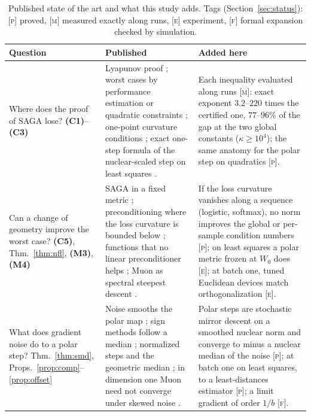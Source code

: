 \documentclass[10pt]{article}
\theoremstyle{remark}
\newcommand{\finding}[1]{\textbf{(#1)}}
\newcommand{\nat}[1]{\textsc{[#1]}}
\begin{document}
\begin{table}[t]
\caption{Published state of the art and what this study adds. Tags (Section~\ref{sec:status}): \nat{p} proved, \nat{m}
measured exactly along runs, \nat{e} experiment, \nat{f} formal expansion checked by simulation.}\label{tab:sota}
\centering\footnotesize
\renewcommand{\arraystretch}{1.05}
\begin{tabularx}{\textwidth}{@{}>{\raggedright\arraybackslash}p{}YY@{}}
\toprule
Question & Published & Added here \\
\midrule
Where does the proof of SAGA lose? \finding{C1}--\finding{C3} &
Lyapunov proof \cite{defazio2014saga,bach2024learning}; worst cases by performance estimation
\cite{taylor2017smooth} or quadratic constraints \cite{hu2017unified}; one-point curvature conditions \cite{zhang2013gradient}; exact one-step formula
of the nuclear-scaled step on least squares \cite{shulgin2026quadratic,jawanpuria2026constant}. &
Each inequality evaluated along runs \nat{m}: exact exponent $3.2$--$220$ times the certified one, $77$--$96\%$ of the
gap at the two global constants ($\kappa\ge10^4$); the same anatomy for the polar step on quadratics \nat{p}. \\
Can a change of geometry improve the worst case? \finding{C5}, Thm.~\ref{thm:nfl}, \finding{M3}, \finding{M4} &
SAGA in a fixed metric \cite{dragomir2021fast}; preconditioning where the loss curvature is
bounded below \cite{yang2014data,gonen2016solving}; functions that no linear preconditioner helps
\cite{hird2025quantifying}; Muon as spectral steepest descent \cite{bernstein2024old}. &
If the loss curvature vanishes along a sequence (logistic, softmax), no norm improves the global or per-sample condition
numbers \nat{p}; on least squares a polar metric frozen at $W_0$ does \nat{e}; at batch one, tuned Euclidean devices
match orthogonalization \nat{e}. \\
What does gradient noise do to a polar step? Thm.~\ref{thm:smd}, Props.~\ref{prop:comp}--\ref{prop:offset} &
Noise smooths the polar map \cite{xie2026muon,chen2026when}; sign methods follow a median
\cite{chen2020distributed,bernstein2019majority}; normalized steps and the geometric median
\cite{cardot2013efficient}; in dimension one Muon need not converge under skewed noise
\cite{do2026muon}. &
Polar steps are stochastic mirror descent on a smoothed nuclear norm and converge to minus a nuclear median of the
noise \nat{p}; at batch one on least squares, to a least-distances estimator \nat{p}; a limit gradient of order $1/b$
\nat{f}. \\

\end{tabularx}
\end{table}
\end{document}
